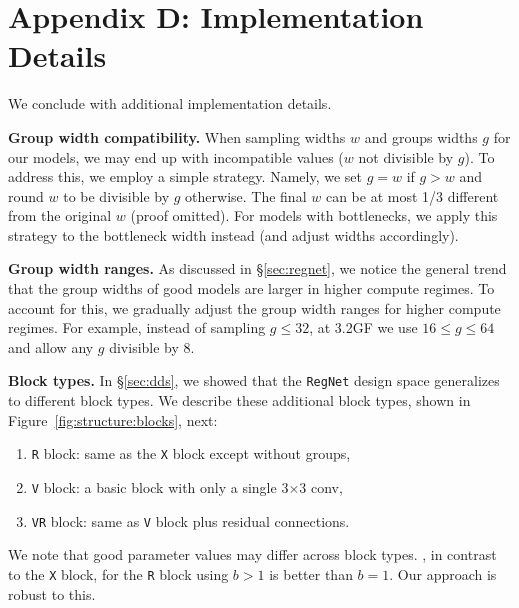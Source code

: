 \documentclass[10pt,twocolumn,letterpaper]{article}
\renewcommand{\paragraph}[1]{\vspace{1.5mm}\noindent\textbf{#1}}
\def\x{{\times}}
\newcommand{\dsname}[1]{\texttt{\small #1}\xspace}
\newcommand{\regnet}{\dsname{RegNet}}
\begin{document}
\section*{Appendix D: Implementation Details}

We conclude with additional implementation details.

\paragraph{Group width compatibility.} When sampling widths $w$ and groups widths $g$ for our models, we may end up with incompatible values (\ie $w$ not divisible by $g$). To address this, we employ a simple strategy. Namely, we set $g=w$ if $g > w$ and round $w$ to be divisible by $g$ otherwise. The final $w$ can be at most 1/3 different from the original $w$ (proof omitted). For models with bottlenecks, we apply this strategy to the bottleneck width instead (and adjust widths accordingly).

\paragraph{Group width ranges.} As discussed in \S\ref{sec:regnet}, we notice the general trend that the group widths of good models are larger in higher compute regimes. To account for this, we gradually adjust the group width ranges for higher compute regimes. For example, instead of sampling {\small $g \le 32$}, at 3.2GF we use {\small $16 \le g \le 64$} and allow any $g$ divisible by 8. 

\paragraph{Block types.} In \S\ref{sec:dds}, we showed that the \regnet design space generalizes to different block types. We describe these additional block types, shown in Figure~\ref{fig:structure:blocks}, next:

\begin{enumerate}[topsep=2pt, itemsep=-1ex]
\item \dsname{R} block: same as the \dsname{X} block except without groups,
\item \dsname{V} block: a basic block with only a single 3$\x$3 conv,
\item \dsname{VR} block: same as \dsname{V} block plus residual connections.
\end{enumerate}
We note that good parameter values may differ across block types. \Eg, in contrast to the \dsname{X} block, for the \dsname{R} block using $b > 1$ is better than $b = 1$. Our approach is robust to this.
\end{document}
